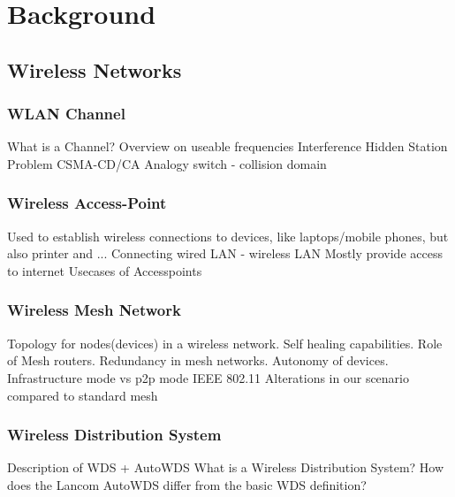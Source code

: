 \chapter{Background}
\section{Wireless Networks}
  \subsection{WLAN Channel}
    What is a Channel?\newline
    Overview on useable frequencies \newline
    Interference\newline
    Hidden Station Problem\newline
    CSMA-CD/CA\newline
    Analogy switch - collision domain \newline
  \subsection{Wireless Access-Point}
    Used to establish wireless connections to devices, like laptops/mobile phones, but also printer and ... 
    Connecting wired LAN - wireless LAN \newline
    Mostly provide access to internet\newline
    Usecases of Accesspoints\newline
  \subsection{Wireless Mesh Network}
    Topology for nodes(devices) in a wireless network.
    Self healing capabilities.
    Role of Mesh routers.
    Redundancy in mesh networks.
    Autonomy of devices.
    \cite{Akyildiz2005445}
    Infrastructure mode vs p2p mode
    IEEE 802.11
    \cite{airberry}
    Alterations in our scenario compared to standard mesh\newline
    \subsection{Wireless Distribution System}
    Description of WDS + AutoWDS \newline
      What is a Wireless Distribution System? \newline
      How does the Lancom AutoWDS differ from the basic WDS definition? \newline
